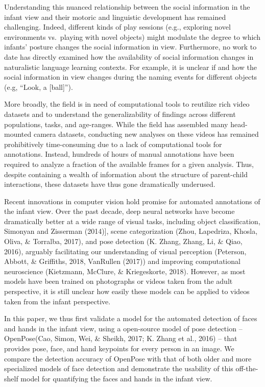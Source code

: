 \documentclass[english,man]{apa6}
\begin{document}
Understanding this nuanced relationship between the social information
in the infant view and their motoric and linguistic development has
remained challenging. Indeed, different kinds of play sessions (e.g.,
exploring novel environments vs.~playing with novel objects) might
modulate the degree to which infants' posture changes the social
information in view. Furthermore, no work to date has directly examined
how the availability of social information changes in naturalistic
language learning contexts. For example, it is unclear if and how the
social information in view changes during the naming events for
different objects (e.g, \enquote{Look, a {[}ball{]}}).

More broadly, the field is in need of computational tools to reutilize
rich video datasets and to understand the generalizability of findings
across different populations, tasks, and age-ranges. While the field has
assembled many head-mounted camera datasets, conducting new analyses on
these videos has remained prohibitively time-consuming due to a lack of
computational tools for annotations. Instead, hundreds of hours of
manual annotations have been required to analyze a fraction of the
available frames for a given analysis. Thus, despite containing a wealth
of information about the structure of parent-child interactions, these
datasets have thus gone dramatically underused.

Recent innovations in computer vision hold promise for automated
annotations of the infant view. Over the past decade, deep neural
networks have become dramatically better at a wide range of visual
tasks, including object classification, Simonyan and Zisserman
(2014){]}, scene categorization (Zhou, Lapedriza, Khosla, Oliva, \&
Torralba, 2017), and pose detection (K. Zhang, Zhang, Li, \& Qiao,
2016), arguably facilitating our understanding of visual perception
(Peterson, Abbott, \& Griffiths, 2018, VanRullen (2017)) and improving
computational neuroscience (Kietzmann, McClure, \& Kriegeskorte, 2018).
However, as most models have been trained on photographs or videos taken
from the adult perspective, it is still unclear how easily these models
can be applied to videos taken from the infant perspective.

In this paper, we thus first validate a model for the automated
detection of faces and hands in the infant view, using a open-source
model of pose detection -- OpenPose(Cao, Simon, Wei, \& Sheikh, 2017; K.
Zhang et al., 2016) -- that provides pose, face, and hand keypoints for
every person in an image. We compare the detection accuracy of OpenPose
with that of both older and more specialized models of face detection
and demonstrate the usability of this off-the-shelf model for
quantifying the faces and hands in the infant view.
\end{document}
